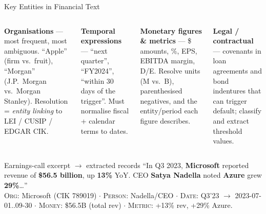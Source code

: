 \documentclass[9pt,t]{beamer}
\begin{document}
\begin{frame}{Key Entities in Financial Text}
\begin{columns}[T]
\textbf{Organisations} --- most frequent, most ambiguous. ``Apple'' (firm vs.\
fruit), ``Morgan'' (J.P.\ Morgan vs.\ Morgan Stanley). Resolution =
\emph{entity linking} to LEI / CUSIP / EDGAR CIK.

\medskip
\textbf{Temporal expressions} --- ``next quarter'', ``FY2024'', ``within 30 days of
the trigger''. Must normalise fiscal + calendar terms to dates.

\textbf{Monetary figures \& metrics} --- \$ amounts, \%, EPS, EBITDA margin, D/E.
Resolve units (M vs.\ B), parenthesised negatives, and the entity/period each
figure describes.

\medskip
\textbf{Legal / contractual} --- covenants in loan agreements and bond indentures
that can trigger default; classify and extract threshold values.
\end{columns}

\medskip
\begin{exampleblock}{Earnings-call excerpt $\to$ extracted records}
``In Q3 2023, \textbf{Microsoft} reported revenue of \textbf{\$56.5 billion}, up
\textbf{13\%} YoY. CEO \textbf{Satya Nadella} noted \textbf{Azure} grew \textbf{29\%}\dots''
\\[2pt]
\textsc{Org}: Microsoft (CIK 789019) $\cdot$ \textsc{Person}: Nadella/CEO $\cdot$
\textsc{Date}: Q3'23 $\to$ 2023-07-01..09-30 $\cdot$ \textsc{Money}: \$56.5B (total rev) $\cdot$
\textsc{Metric}: +13\% rev, +29\% Azure.
\end{exampleblock}
\end{frame}
\end{document}

